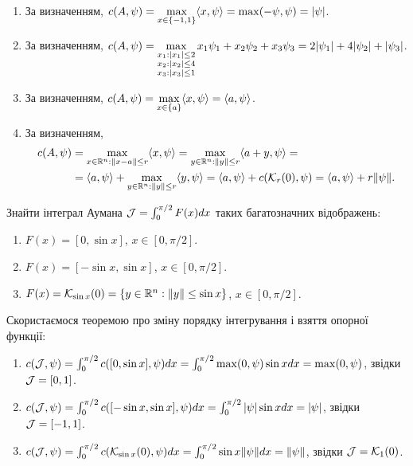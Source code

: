 \begin{solution}
    \begin{enumerate}
        \item За визначенням, $c(A, \psi) = \displaystyle\max\limits_{x \in \{-1, 1\}} \langle x, \psi\rangle = \max(-\psi,\psi) = |\psi|$.
        \item За визначенням, $c(A, \psi) = \displaystyle\max\limits_{\substack{ x_1 : |x_1| \le 2 \\ x_2 : |x_2| \le  4 \\ x_3 : |x_3| \le 1 }} x_1 \psi_1 + x_2 \psi_2 + x_3 \psi_3  = 2 |\psi_1| + 4 |\psi_2| + |\psi_3|$.
        \item За визначенням, $c(A, \psi) = \displaystyle\max\limits_{x \in \{ a \}} \langle x, \psi\rangle = \langle a, \psi\rangle $.
        \item За визначенням, 
        \begin{align*}
            c(A, \psi) &= \displaystyle\max\limits_{x \in \mathbb{R}^n : \| x - a \| \le r} \langle x, \psi\rangle = \displaystyle\max\limits_{y \in \mathbb{R}^n : \| y \| \le r} \langle a + y, \psi\rangle = \\
            &= \langle a, \psi\rangle + \displaystyle\max\limits_{y \in \mathbb{R}^n : \| y \| \le r} \langle y, \psi\rangle = \langle a, \psi\rangle + c(\mathcal{K}_r(0), \psi) = \langle a, \psi \rangle + r\|\psi\|.
        \end{align*}
    \end{enumerate}
\end{solution}

\begin{problem}
    Знайти інтеграл Аумана $\mathcal{J} = \int_0^{\pi/2} F(x) dx$ таких багатозначних відображень:
    \begin{enumerate}
        \item $F(x) = [0, \sin x]$, $x \in [0, \pi / 2]$.
        \item $F(x) = [-\sin x, \sin x]$, $x \in [0, \pi / 2]$.
        \item $F(x) = \mathcal{K}_{\sin x}(0) = \{ y \in \mathbb{R}^n : \| y \| \le \sin x \}$, $x \in [0, \pi / 2]$.
    \end{enumerate}
\end{problem}

\begin{solution}
    Скористаємося теоремою про зміну порядку інтегрування і взяття опорної функції:
    \begin{enumerate}
        \item $c(\mathcal{J}, \psi) = \int_0^{\pi/2} c([0, \sin x], \psi) dx = \int_0^{\pi/2} \max(0, \psi) \sin x dx = \max(0, \psi)$, звідки $\mathcal{J} = [0, 1]$.
        \item $c(\mathcal{J}, \psi) = \int_0^{\pi/2} c([-\sin x, \sin x], \psi) dx = \int_0^{\pi/2} |\psi| \sin x dx = |\psi|$, звідки $\mathcal{J} = [-1, 1]$.
        \item $c(\mathcal{J}, \psi) = \int_0^{\pi/2} c(\mathcal{K}_{\sin x}(0), \psi) dx = \int_0^{\pi/2} \sin x \|\psi\| dx = \|\psi\|$, звідки $\mathcal{J} = \mathcal{K}_1(0)$. 
    \end{enumerate}
\end{solution}

